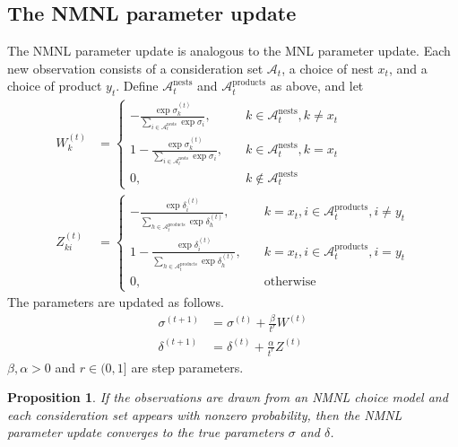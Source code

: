 \documentclass[preprint,12pt,authoryear]{elsarticle}
\newtheorem{proposition}{Proposition}
\begin{document}
\subsection{The NMNL parameter update}
The NMNL parameter update is analogous to the MNL parameter update. Each new observation consists of a consideration set $\mathcal{A}_t$, a choice of nest $x_t$, and a choice of product $y_t$. Define $\mathcal{A}_t^{\text{nests}}$ and $\mathcal{A}_{t}^{\text{products}}$ as above, and let
\begin{align}
W^{(t)}_k &= \begin{cases}
 -  \frac{\exp \sigma^{(t)}_k}{\sum_{i\in \mathcal{A}_{t}^{\text{nests}}} \exp \sigma_i}, \quad & k \in \mathcal{A}_{t}^{\text{nests}}, k \neq x_t\\
1 -  \frac{\exp \sigma^{(t)}_k}{\sum_{i\in \mathcal{A}_{t}^{\text{nests}}} \exp \sigma_i}, \quad & k \in \mathcal{A}_{t}^{\text{nests}}, k = x_t\\
0, \quad & k \notin \mathcal{A}_{t}^{\text{nests}}
\end{cases} \\
Z^{(t)}_{ki} &= 
\begin{cases}
 - \frac{\exp \delta^{(t)}_i}{\sum_{h\in \mathcal{A}_t^{\text{products}}} \exp \delta^{(t)}_h}, \quad&k = x_t, i \in \mathcal{A}_t^{\text{products}}, i\neq y_t \\
1 - \frac{\exp \delta^{(t)}_i}{\sum_{h\in \mathcal{A}_t^{\text{products}}} \exp \delta^{(t)}_h} , \quad&k = x_t, i \in \mathcal{A}_t^{\text{products}}, i =  y_t \\
0, \quad & \text{otherwise}
\end{cases}
\end{align}
The parameters are updated as follows.
\begin{align}\label{nmnlparameterupdate}
\sigma^{(t+1)} &= \sigma^{(t)} + \frac{\beta}{t^r} W^{(t)} \\
\delta^{(t+1)} &= \delta^{(t)} +  \frac{\alpha}{t^r} Z^{(t)} 
\end{align}
$\beta, \alpha >0$ and $r \in (0, 1]$ are step parameters.

\begin{proposition}If the observations are drawn from an NMNL choice model and each consideration set appears with nonzero probability, then the NMNL parameter update converges to the true parameters $\sigma$ and $\delta$.\end{proposition}
\end{document}
